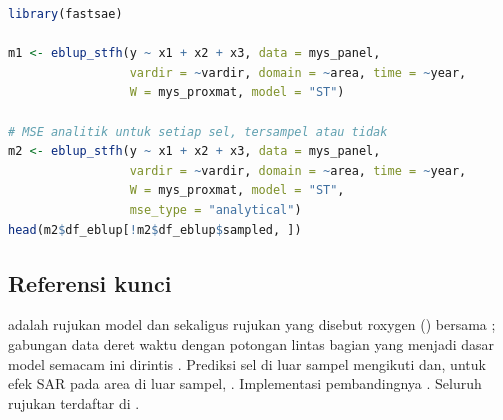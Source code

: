 \begin{lstlisting}[language=R,caption={Contoh yang dapat dijalankan (dari \texttt{man/eblup\_stfh.Rd}); domain 21 dan 25 tidak pernah tersampel.}]
library(fastsae)

m1 <- eblup_stfh(y ~ x1 + x2 + x3, data = mys_panel,
                 vardir = ~vardir, domain = ~area, time = ~year,
                 W = mys_proxmat, model = "ST")

# MSE analitik untuk setiap sel, tersampel atau tidak
m2 <- eblup_stfh(y ~ x1 + x2 + x3, data = mys_panel,
                 vardir = ~vardir, domain = ~area, time = ~year,
                 W = mys_proxmat, model = "ST",
                 mse_type = "analytical")
head(m2$df_eblup[!m2$df_eblup$sampled, ])
\end{lstlisting}

\subsection{Referensi kunci}\label{sec:stfh-ref}

\citet{marhuenda2013small} adalah rujukan model dan sekaligus rujukan yang
disebut roxygen () bersama \citet{rao2015small};
gabungan data deret waktu dengan potongan lintas bagian yang menjadi dasar
model semacam ini dirintis \citet{rao1994small}. Prediksi sel di luar sampel
mengikuti \citet{saei2005out} dan, untuk efek SAR pada area di luar sampel,
\citet{benedetti2024handling}. Implementasi pembandingnya 
\citep{molina2015sae}. Seluruh rujukan terdaftar di .
